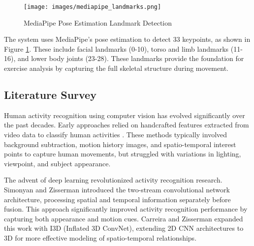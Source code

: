 \documentclass[11pt]{article}
\begin{document}
\begin{figure}[htbp]
    \centering
    \texttt{[image: images/mediapipe\_landmarks.png]}
    \caption{MediaPipe Pose Estimation Landmark Detection}
    \label{fig:mediapipe_landmarks}
\end{figure}


The system uses MediaPipe's pose estimation to detect 33 keypoints, as shown in Figure \ref{fig:mediapipe_landmarks}. These include facial landmarks (0-10), torso and limb landmarks (11-16), and lower body joints (23-28). These landmarks provide the foundation for exercise analysis by capturing the full skeletal structure during movement.










\subsection{Literature Survey}
Human activity recognition using computer vision has evolved significantly over the past decades. Early approaches relied on handcrafted features extracted from video data to classify human activities \cite{aggarwal2011}. These methods typically involved background subtraction, motion history images, and spatio-temporal interest points to capture human movements, but struggled with variations in lighting, viewpoint, and subject appearance.

The advent of deep learning revolutionized activity recognition research. Simonyan and Zisserman \cite{simonyan2014} introduced the two-stream convolutional network architecture, processing spatial and temporal information separately before fusion. This approach significantly improved activity recognition performance by capturing both appearance and motion cues. Carreira and Zisserman \cite{carreira2017} expanded this work with I3D (Inflated 3D ConvNet), extending 2D CNN architectures to 3D for more effective modeling of spatio-temporal relationships.
\end{document}
